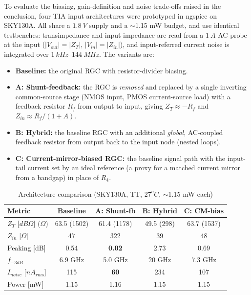 \documentclass{article}
\begin{document}
To evaluate the biasing, gain-definition and noise trade-offs raised in the
conclusion, four TIA input architectures were prototyped in ngspice on SKY130A.
All share a $1.8\ V$ supply and a $\sim$1.15 mW budget, and use identical
testbenches: transimpedance and input impedance are read from a $1\ A$ AC probe
at the input ($|V_{out}|=|Z_T|$, $|V_{in}|=|Z_{in}|$), and input-referred current
noise is integrated over $1\ kHz$--$144\ MHz$. The variants are:
\begin{itemize}
    \item \textbf{Baseline:} the original RGC with resistor-divider biasing.
    \item \textbf{A: Shunt-feedback:} the RGC is \emph{removed} and replaced by
    a single inverting common-source stage (NMOS input, PMOS current-source load)
    with a feedback resistor $R_f$ from output to input, giving $Z_T\approx -R_f$ and
    $Z_{in}\approx R_f/(1+A)$.
    \item \textbf{B: Hybrid:} the baseline RGC with an additional \emph{global},
    AC-coupled feedback resistor from output back to the input node (nested loops).
    \item \textbf{C: Current-mirror-biased RGC:} the baseline signal path with
    the input-tail current set by an ideal reference (a proxy for a matched current
    mirror from a bandgap) in place of $R_4$.
\end{itemize}

\begin{table}[H]
    \centering
    \caption{Architecture comparison (SKY130A, TT, $27^oC$, $\sim$1.15 mW each)}
    \label{tab:arch}
    \begin{tabular}{l|c|c|c|c} \hline
        \textbf{Metric} & \textbf{Baseline} & \textbf{A: Shunt-fb} & \textbf{B: Hybrid} & \textbf{C: CM-bias} \\ \hline
        $Z_T$ [$dB\Omega$] ($\Omega$) & 63.5 (1502) & 61.4 (1178) & 49.5 (298) & 63.7 (1537) \\ \hline
        $Z_{in}$ [$\Omega$] & 47 & 322 & 39 & 48 \\ \hline
        Peaking [dB] & 0.54 & \textbf{0.02} & 2.73 & 0.69 \\ \hline
        $f_{-3dB}$ & 6.9 GHz & 5.0 GHz & 20 GHz & 7.3 GHz \\ \hline
        $I_{noise}$ [$nA_{rms}$] & 115 & \textbf{60} & 234 & 107 \\ \hline
        Power [mW] & 1.15 & 1.16 & 1.15 & 1.15 \\ \hline
    \end{tabular}
\end{table}
\end{document}

